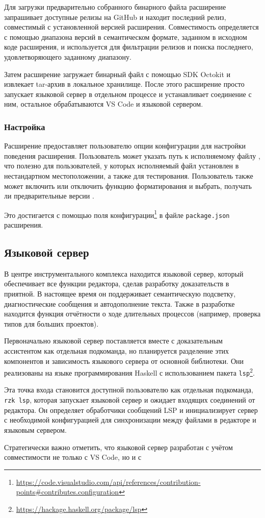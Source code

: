 Для загрузки предварительно собранного бинарного файла \Rzk{} расширение запрашивает доступные релизы на GitHub и находит последний релиз, совместимый с установленной версией расширения. Совместимость определяется с помощью диапазона версий в семантическом формате\cite{Preston2013semantic}, заданном в исходном коде расширения, и используется для фильтрации релизов и поиска последнего, удовлетворяющего заданному диапазону.

Затем расширение загружает бинарный файл с помощью SDK Octokit и извлекает tar-архив в локальное хранилище. После этого расширение просто запускает языковой сервер в отдельном процессе и устанавливает соединение с ним, остальное обрабатываются VS Code и языковой сервером.

\subsubsection{Настройка}

Расширение предоставляет пользователю опции конфигурации для настройки поведения расширения. Пользователь может указать путь к исполняемому файлу \Rzk{}, что полезно для пользователей, у которых исполняемый файл установлен в нестандартном местоположении, а также для тестирования. Пользователь также может включить или отключить функцию форматирования и выбрать, получать ли предварительные версии \Rzk{}.

Это достигается с помощью поля конфигурации\footnote{\url{https://code.visualstudio.com/api/references/contribution-points\#contributes.configuration}} в файле \texttt{package.json} расширения.

\subsection{Языковой сервер \Rzk{}}

В центре инструментального комплекса \Rzk{} находится языковой сервер, который обеспечивает все функции редактора, сделав разработку доказательств в \Rzk{} приятной. В настоящее время он поддерживает семантическую подсветку, диагностические сообщения и автодополнение текста. Также в разработке находится функция отчётности о ходе длительных процессов (например, проверка типов для больших проектов).

Первоначально языковой сервер поставляется вместе с доказательным ассистентом \Rzk{} как отдельная подкоманда, но планируется разделение этих компонентов и зависимость языкового сервера от основной библиотеки. Они реализованы на языке программирования Haskell с использованием пакета \texttt{lsp}\footnote{\url{https://hackage.haskell.org/package/lsp}}.

Эта точка входа становится доступной пользователю как отдельная подкоманда, \texttt{rzk lsp}, которая запускает языковой сервер и ожидает входящих соединений от редактора. Он определяет обработчики сообщений LSP и инициализирует сервер с необходимой конфигурацией для синхронизации между файлами в редакторе и языковым сервером.

Стратегически важно отметить, что языковой сервер разработан с учётом совместимости не только с VS Code, но и с
